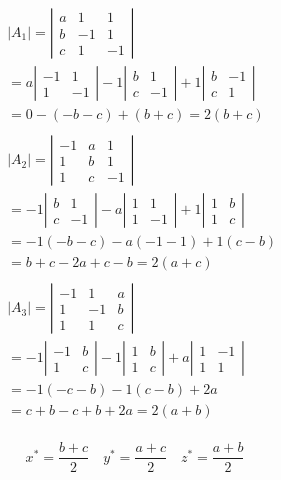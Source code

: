 \documentclass{./../../Latex/homework}
\begin{document}
\begin{enumerate}
$$
\begin{aligned}
& \left|A_{1}\right|=\left|\begin{array}{ccc}a & 1 & 1 \\b & -1 & 1 \\c & 1 & -1\end{array}\right| \\
& =a\left|\begin{array}{cc}-1 & 1 \\1 & -1\end{array}\right|-1\left|\begin{array}{cc}b & 1 \\c & -1\end{array}\right|+1\left|\begin{array}{cc}b & -1 \\c & 1\end{array}\right| \\
& =0-(-b-c)+(b+c)=2(b+c) \\~\\
& \left|A_{2}\right|=\left|\begin{array}{rrr}-1 & a & 1 \\1 & b & 1 \\1 & c & -1\end{array}\right| \\
& =-1\left|\begin{array}{cc}b & 1 \\c & -1\end{array}\right|-a\left|\begin{array}{cc}1 & 1 \\1 & -1\end{array}\right|+1\left|\begin{array}{ll}1 & b \\1 & c\end{array}\right| \\
& =-1(-b-c)-a(-1-1)+1(c-b) \\
& =b+c-2 a+c-b=2(a+c) \\~\\
& \left|A_{3}\right|=\left|\begin{array}{rrr}-1 & 1 & a \\1 & -1 & b \\1 & 1 & c\end{array}\right| \\
& =-1\left|\begin{array}{rr}-1 & b \\1 & c\end{array}\right|-1\left|\begin{array}{ll}1 & b \\1 & c\end{array}\right|+a\left|\begin{array}{cc}1 & -1 \\1 & 1\end{array}\right| \\
& =-1(-c-b)-1(c-b)+2 a \\
& =c+b-c+b+2 a=2(a+b) \\
\end{aligned}
$$

$$
x^{*}=\frac{b+c}{2} \quad y^{*}=\frac{a+c}{2} \quad z^{*}=\frac{a+b}{2}
$$

\end{enumerate}
\end{document}

